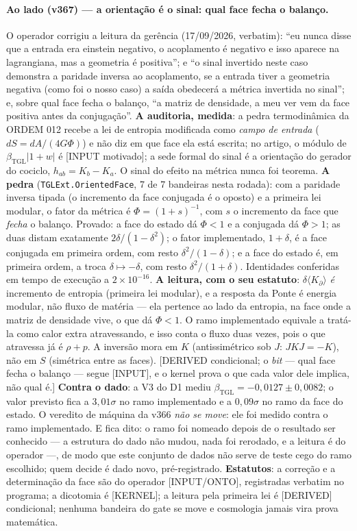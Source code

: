 \documentclass[11pt]{article}
\newcommand{\bTGL}{\beta_{\mathrm{TGL}}}\newcommand{\Msun}{M_{\odot}}\newcommand{\TGL}{\mathrm{TGL}}
\theoremstyle{definition}\newtheorem{deriv}{Derivação}
\begin{document}
\paragraph*{Ao lado (v367) --- a orientação é o sinal: qual face fecha o balanço.} O operador corrigiu a leitura da gerência (17/09/2026, verbatim): ``eu nunca disse que a entrada era einstein negativo, o acoplamento é negativo e isso aparece na lagrangiana, mas a geometria é positiva''; e ``o sinal invertido neste caso demonstra a paridade inversa ao acoplamento, se a entrada tiver a geometria negativa (como foi o nosso caso) a saída obedecerá a métrica invertida no sinal''; e, sobre qual face fecha o balanço, ``a matriz de densidade, a meu ver vem da face positiva antes da conjugação''. \textbf{A auditoria, medida}: a pedra termodinâmica da ORDEM 012 recebe a lei de entropia modificada como \emph{campo de entrada} ($dS=dA/(4G\Phi)$) e não diz em que face ela está escrita; no artigo, o módulo de $\bTGL|1+w|$ é [INPUT motivado]; a sede formal do sinal é a orientação do gerador do cociclo, $h_{ab}=K_b-K_a$. O sinal do efeito na métrica nunca foi teorema. \textbf{A pedra} (\texttt{TGLExt.OrientedFace}, 7 de 7 bandeiras nesta rodada): com a paridade inversa tipada (o incremento da face conjugada é o oposto) e a primeira lei modular, o fator da métrica é $\Phi=(1+s)^{-1}$, com $s$ o incremento da face que \emph{fecha} o balanço. Provado: a face do estado dá $\Phi<1$ e a conjugada dá $\Phi>1$; as duas distam exatamente $2\delta/(1-\delta^2)$; o fator implementado, $1+\delta$, é a face conjugada em primeira ordem, com resto $\delta^2/(1-\delta)$; e a face do estado é, em primeira ordem, a troca $\delta\mapsto-\delta$, com resto $\delta^2/(1+\delta)$. Identidades conferidas em tempo de execução a $2\times10^{-16}$. \textbf{A leitura, com o seu estatuto}: $\delta\langle K_\partial\rangle$ \emph{é} incremento de entropia (primeira lei modular), e a resposta da Ponte é energia modular, não fluxo de matéria --- ela pertence ao lado da entropia, na face onde a matriz de densidade vive, o que dá $\Phi<1$. O ramo implementado equivale a tratá-la como calor extra atravessando, e isso conta o fluxo duas vezes, pois o que atravessa já é $\rho+p$. A inversão mora em $K$ (antissimétrico sob $J$: $JKJ=-K$), não em $S$ (simétrica entre as faces). [DERIVED condicional; o \emph{bit} --- qual face fecha o balanço --- segue [INPUT], e o kernel prova o que cada valor dele implica, não qual é.] \textbf{Contra o dado}: a V3 do D1 mediu $\bTGL=-0{,}0127\pm0{,}0082$; o valor previsto fica a $3{,}01\sigma$ no ramo implementado e a $0{,}09\sigma$ no ramo da face do estado. O veredito de máquina da v366 \emph{não se move}: ele foi medido contra o ramo implementado. E fica dito: o ramo foi nomeado depois de o resultado ser conhecido --- a estrutura do dado não mudou, nada foi rerodado, e a leitura é do operador ---, de modo que este conjunto de dados não serve de teste cego do ramo escolhido; quem decide é dado novo, pré-registrado. \textbf{Estatutos}: a correção e a determinação da face são do operador [INPUT/ONTO], registradas verbatim no programa; a dicotomia é [KERNEL]; a leitura pela primeira lei é [DERIVED] condicional; nenhuma bandeira do gate se move e cosmologia jamais vira prova matemática.
\end{document}
